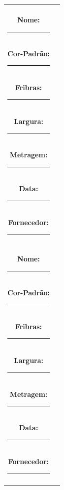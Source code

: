 \documentclass[
]{article}
\begin{document}
\begin{center}
\begin{tabular}{cc}
\begin{minipage}[t]{0.42\textwidth}
\small
\fbox{\rule{0pt}{3cm}\rule{5cm}{0pt}} \\[0.2cm]
\textbf{Nome:} \rule{Xcm}{0.4pt} \\
\textbf{Cor-Padrão:} \rule{4.2cm}{0.4pt} \\
\textbf{Fribras:} \rule{4.2cm}{0.4pt} \\
\textbf{Largura:} \rule{4.7cm}{0.4pt} \\
\textbf{Metragem:} \rule{4.5cm}{0.4pt} \\
\textbf{Data:} \rule{5cm}{0.4pt} \\
\textbf{Fornecedor:} \rule{4.3cm}{0.4pt} \\[0.2cm]
\end{minipage}
 & 
\begin{minipage}[t]{0.42\textwidth}
\small
\fbox{\rule{0pt}{3cm}\rule{5cm}{0pt}} \\[0.2cm]
\textbf{Nome:} \rule{Xcm}{0.4pt} \\
\textbf{Cor-Padrão:} \rule{4.2cm}{0.4pt} \\
\textbf{Fribras:} \rule{4.2cm}{0.4pt} \\
\textbf{Largura:} \rule{4.7cm}{0.4pt} \\
\textbf{Metragem:} \rule{4.5cm}{0.4pt} \\
\textbf{Data:} \rule{5cm}{0.4pt} \\
\textbf{Fornecedor:} \rule{4.3cm}{0.4pt} \\[0.2cm]
\end{minipage}
 \\ [1cm]

\end{tabular}
\end{center}
\end{document}
